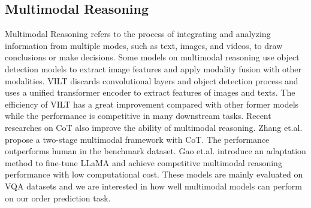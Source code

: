 \documentclass[11pt]{article}
\begin{document}
\subsection{Multimodal Reasoning}
Multimodal Reasoning refers to the process of integrating and analyzing information from multiple modes, such as text, images, and videos, to draw conclusions or make decisions. Some models\citep{li2020oscar,zhang2021vinvl} on multimodal reasoning use object detection models to extract image features and apply modality fusion with other modalities. VILT\citep{kim2021vilt} discards convolutional layers and object detection process and uses a unified transformer encoder to extract features of images and texts. The efficiency of VILT has a great improvement compared with other former models while the performance is competitive in many downstream tasks. Recent researches on CoT also improve the ability of multimodal reasoning. Zhang et.al.\citep{zhang2023multimodal} propose a two-stage multimodal framework with CoT. The performance outperforms human in the benchmark dataset. Gao et.al.\citep{gao2023llama} introduce an adaptation method to fine-tune LLaMA\citep{touvron2023llama} and achieve competitive multimodal reasoning performance with low computational cost. These models are mainly evaluated on VQA datasets and we are interested in how well multimodal models can perform on our order prediction task.


\begin{table}[htp]
\centering
\caption{WikiOrder statistics. We collect 10 categories of WikiHow articles. \textbf{HC}.=Hobbies and Crafts, \textbf{AE.}=Arts and Entertainment, \textbf{CE.}=Computers and Electronics, \textbf{EC.}=Education and Communication, \textbf{FL.}=Family Life, \textbf{HG.}=Home and Garden, \textbf{PS.}=Personal Care and Style, \textbf{PR.}=Philosophy and Religion. \textbf{Avg. Len.} represents the average length of headlines. Numbers in \textbf{\#Pairs} are the size of train/validation/test sets.}
\label{statistics}
\end{table}
\end{document}
